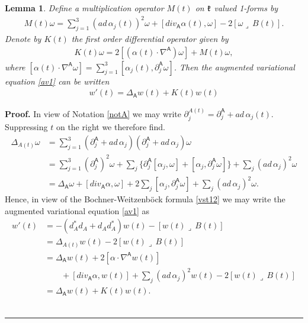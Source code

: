 \documentclass[12pt]{article}
\newtheorem{lemma}[theorem]{Lemma}
\newenvironment{proof}[1][Proof]{\textbf{#1.} }{\ \rule{0.5em}{0.5em}}
\def \As{\mathsf{A}}
\def \w{\omega}
\def \kf{\frak k}
\def \p{\partial}
\def \n{\nabla}
\def \eref{\eqref}
\def \lrc{\lrcorner\,}
\numberwithin{equation}{section}
\begin{document}
\begin{lemma}\label{lemaug1} 
 Define a multiplication operator $M(t)$ 
on $\kf$ valued 1-forms by
\begin{align}
M(t)\w = \sum_{j=1}^3 (ad\, \alpha_j(t))^2 \w + [ div_\As \alpha(t), \w] -2[\w \lrc B(t)] .   \label{ps11}
\end{align}
Denote by $K(t)$ the  first order differential operator given  by
\begin{align}
K(t)\w = 2 [(\alpha(t)\cdot \n^\As) \w] + M(t) \w,                                 \label{ps13}
\end{align}
where  $[\alpha(t)\cdot \n^\As \w] =\sum_{j=1}^3 [\alpha_j(t), \p_j^{\As} \w]$. 
Then the augmented variational equation \eref{av1} can be written
\begin{align}
w'(t) = \Delta_\As w(t) +K(t) w(t)    \label{vst20}
\end{align}
\end{lemma}
      \begin{proof} In view of Notation \ref{notA} we may write $\p_j^{A(t)} = \p_j^\As + ad\, \alpha_j(t)$.
Suppressing  $t$ on the right we therefore find. 
      \begin{align*}
\Delta_{A(t)}\w &= \sum_{j=1}^3 (\p_j^\As + ad\,\alpha_j)(\p_j^\As + ad\,\alpha_j) \w \\
&=\sum_{j=1}^3(\p_j^\As)^2 \w + \sum_j \{  \p_j^\As [\alpha_j, \w] + [\alpha_j, \p_j^\As \w] \} 
+ \sum_j (ad\, \alpha_j)^2 \w \\
& = \Delta_\As\w       
                   + [div_\As \alpha, \w] +2\sum_j [\alpha_j, \p_j^\As \w] 
   + \sum_j (ad\, \alpha_j)^2 \w .
\end{align*}
Hence, in view of the Bochner-Weitzenb\"ock formula \eref{vst12} we may write the augmented
 variational equation \eref{av1} as
\begin{align*}
w'(t) &= -(d_A^* d_A  +d_Ad_A^*)w(t) - [w(t)\lrc B(t)] \\
&= \Delta_{A(t)} w(t) - 2 [w(t)\lrc B(t)] \\
&=\Delta_\As w(t) + 2[\alpha\cdot \n^\As w(t)]   \\
&\ \ \ \ \ \ \ \ \ +  [div_\As \alpha, w(t) ]  + \sum_j (ad\, \alpha_j)^2 w(t) - 2 [w(t)\lrc B(t)] \\
& =  \Delta_\As w(t) + K(t) w(t).
\end{align*}
\end{proof}
\end{document}
